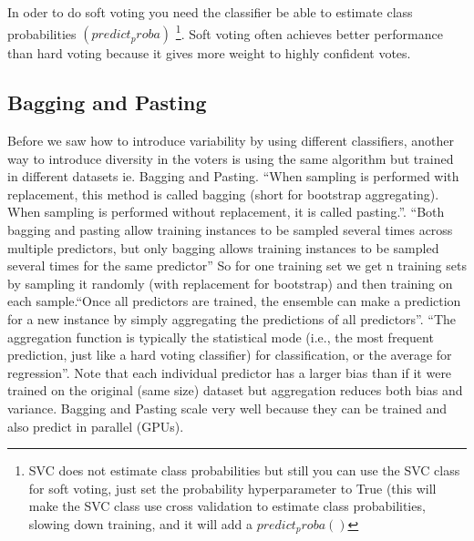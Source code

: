 \documentclass[11pt]{article}
\begin{document}
In oder to do soft voting you need the classifier be able to estimate class probabilities $(predict_proba)$ \footnote{SVC does not estimate class probabilities but still you can use the SVC class for soft voting, just set the probability hyperparameter to True (this will make the SVC class use cross validation to estimate class probabilities, slowing down training, and it will add a $predict_proba()$}. Soft voting often achieves better performance than hard voting because it gives more weight to highly confident votes.


\subsection{Bagging and Pasting}
Before we saw how to introduce variability by using different classifiers, another way to introduce diversity in the voters is using the same algorithm but trained in different datasets ie. Bagging and Pasting.
“When sampling is performed with replacement, this method is called bagging (short for bootstrap aggregating). When sampling is performed without replacement, it is called pasting.”. “Both bagging and pasting allow training instances to be sampled several times across multiple predictors, but only bagging allows training instances to be sampled several times for the same predictor”
So for one training set we get n training sets by sampling it randomly (with replacement for bootstrap) and then training on each sample.“Once all predictors are trained, the ensemble can make a prediction for a new instance by simply aggregating the predictions of all predictors”. “The aggregation function is typically the statistical mode (i.e., the most frequent prediction, just like a hard voting classifier) for classification, or the average for regression”. Note that each individual predictor has a larger bias than if it were trained on the original (same size) dataset but aggregation reduces both bias and variance.
Bagging and Pasting scale very well because they can be trained and also predict in parallel (GPUs).
\end{document}
